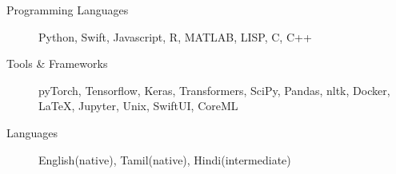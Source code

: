 \begin{description}
\item[Programming Languages] Python, Swift, Javascript, R, MATLAB, LISP, C, C++

\item[Tools \& Frameworks] pyTorch, Tensorflow, Keras, Transformers, SciPy, Pandas, nltk, Docker, \LaTeX, Jupyter, Unix, SwiftUI, CoreML

\item[Languages] English(native), Tamil(native), Hindi(intermediate)
\end{description}
